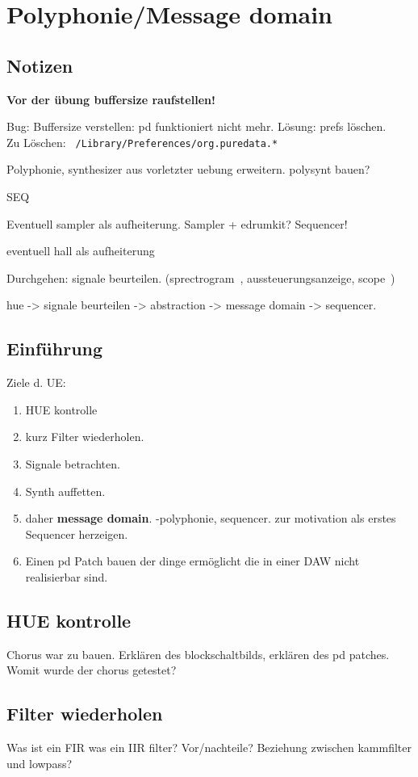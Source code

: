 \chapter{Polyphonie/Message domain}
\label{polyphonie}
\section{Notizen}

\textbf{Vor der übung buffersize raufstellen!}

Bug: Buffersize verstellen: pd funktioniert nicht mehr.
Lösung: prefs löschen.\\
Zu Löschen: 
\texttt{~/Library/Preferences/org.puredata.*}

Polyphonie, synthesizer aus vorletzter uebung erweitern.
polysynt bauen?

SEQ

Eventuell sampler als aufheiterung. Sampler + edrumkit?
Sequencer!


eventuell hall als aufheiterung

Durchgehen: signale beurteilen. (sprectrogram~,  aussteuerungsanzeige, scope~)

hue -> signale beurteilen -> abstraction -> message domain -> sequencer.

\section{Einführung}
Ziele d. UE:
\begin{enumerate}
	\item HUE kontrolle
	\item kurz Filter wiederholen.
	\item Signale betrachten.
	\item Synth auffetten.
	\item daher \textbf{message domain}. -polyphonie, sequencer. zur motivation als erstes Sequencer herzeigen.
	\item Einen pd Patch bauen der dinge ermöglicht die in einer DAW nicht realisierbar sind.
\end{enumerate}

\section{HUE kontrolle}
Chorus war zu bauen. Erklären des blockschaltbilds, erklären des pd patches. Womit wurde der chorus getestet?

\section{Filter wiederholen}
Was ist ein FIR was ein IIR filter?
Vor/nachteile?
Beziehung zwischen kammfilter und lowpass?


